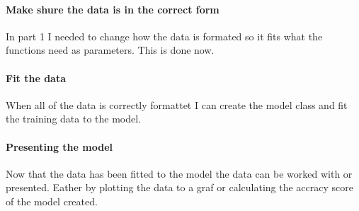 \documentclass[11pt]{article}
\begin{document}
    \paragraph{Make shure the data is in the correct form}
    In part 1 I needed to change how the data is formated so it fits what the functions need as parameters. This is done now.

    \paragraph{Fit the data}
    When all of the data is correctly formattet I can create the model class and fit the training data to the model.

    \paragraph{Presenting the model}
    Now that the data has been fitted to the model the data can be worked with or presented. Eather by plotting the data to a graf or calculating the accracy score of the model created.
\end{document}
